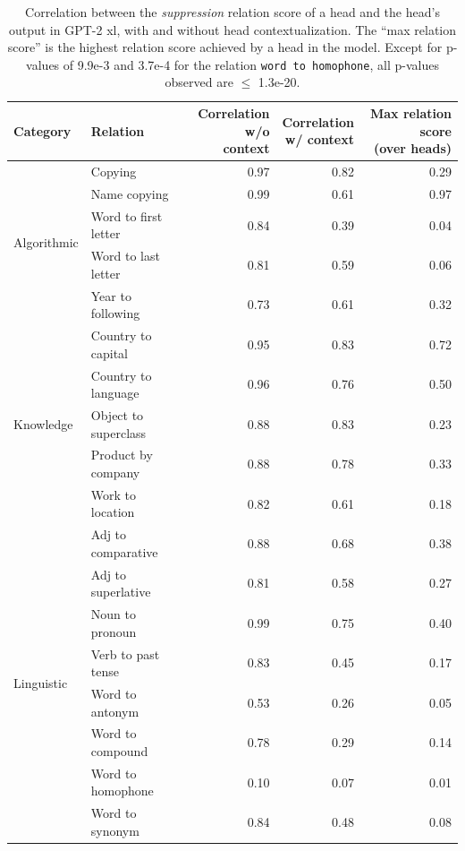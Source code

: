 \documentclass[11pt]{article}
\newcommand{\GPTxl}{GPT-2 xl}
\begin{document}
\begin{table}[p]
\centering
\footnotesize

\begin{tabular}{llrrr}
\toprule
Category & Relation & \makecell{Correlation\\w/o context} & \makecell{Correlation\\w/ context} & \makecell{Max relation score\\(over heads)} \\
\midrule
\multirow{5}{*}{Algorithmic} & Copying & 0.97 & 0.82 & 0.29 \\
 & Name copying & 0.99 & 0.61 & 0.97 \\
 & Word to first letter & 0.84 & 0.39 & 0.04 \\
 & Word to last letter & 0.81 & 0.59 & 0.06 \\
 & Year to following & 0.73 & 0.61 & 0.32 \\
 \midrule
\multirow{5}{*}{Knowledge} & Country to capital & 0.95 & 0.83 & 0.72 \\
 & Country to language & 0.96 & 0.76 & 0.50 \\
 & Object to superclass & 0.88 & 0.83 & 0.23 \\
 & Product by company & 0.88 & 0.78 & 0.33 \\
 & Work to location & 0.82 & 0.61 & 0.18 \\
 \midrule
\multirow{8}{*}{Linguistic} & Adj to comparative & 0.88 & 0.68 & 0.38 \\
 & Adj to superlative & 0.81 & 0.58 & 0.27 \\
 & Noun to pronoun & 0.99 & 0.75 & 0.40 \\
 & Verb to past tense & 0.83 & 0.45 & 0.17 \\
 & Word to antonym & 0.53 & 0.26 & 0.05 \\
 & Word to compound & 0.78 & 0.29 & 0.14 \\
 & Word to homophone & 0.10 & 0.07 & 0.01 \\
 & Word to synonym & 0.84 & 0.48 & 0.08 \\
\bottomrule
\end{tabular}


\caption{Correlation between the \emph{suppression} relation score of a head and the head's output in \GPTxl{}, with and without head contextualization. The ``max relation score'' is the highest relation score achieved by a head in the model.
Except for p-values of 9.9e-3 and 3.7e-4 for the relation \texttt{word to homophone}, all p-values observed are $\leq$ 1.3e-20.
} 
\label{tab:Dynamic_results_gpt_xl_supression}
\end{table}
\end{document}
